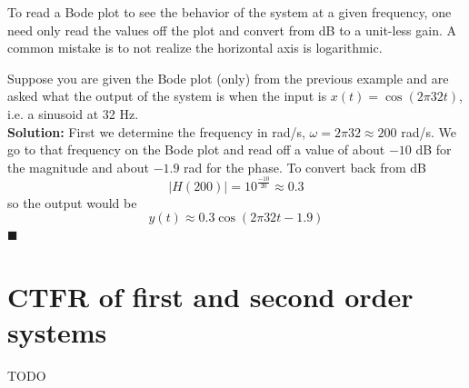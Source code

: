 To read a Bode plot to see the behavior of the system at a given frequency, one need only read the values off the plot and convert from dB to a unit-less gain. A common mistake is to not realize the horizontal axis is logarithmic.

\begin{example}
  Suppose you are given the Bode plot (only) from the previous example and are asked what the output of the system is when the input is $x(t) = \cos(2\pi 32 t)$, i.e. a sinusoid at 32 Hz.\\
  \textbf{Solution:} First we determine the frequency in rad/s, $\omega = 2\pi 32 \approx 200$ rad/s. We go to that frequency on the Bode plot and read off a value of about $-10$ dB for the magnitude and about $-1.9$ rad for the phase. To convert back from dB
  \[
  |H(200)| = 10^{\frac{-10}{20}} \approx 0.3 
  \]
  so the output would be
  \[
  y(t) \approx 0.3\cos(2\pi 32 t - 1.9)
  \]
  $\blacksquare$
\end{example}

\section{CTFR of first and second order systems}

TODO
